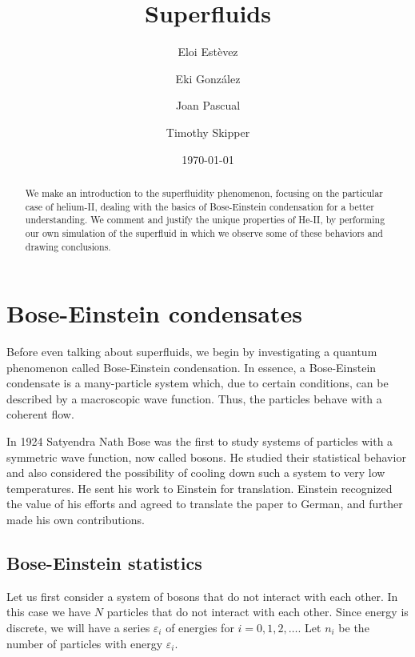 \documentclass{article}
\title{Superfluids}
\author{Eloi Estèvez \and Eki González \and Joan Pascual \and Timothy Skipper}
\date{\today}
\begin{document}
\maketitle
\begin{abstract}

We make an introduction to the superfluidity phenomenon, focusing on the particular case of helium-II, dealing with the basics of Bose-Einstein condensation for a better understanding. We comment and justify the unique properties of He-II, by performing our own simulation of the superfluid in which we observe some of these behaviors and drawing conclusions.


\listoftodos[To-dos]

\end{abstract}
\newpage
\tableofcontents

\section{Bose-Einstein condensates}

Before even talking about superfluids, we begin by investigating a quantum phenomenon called Bose-Einstein condensation.  In essence,
a Bose-Einstein condensate is a many-particle system which, due to certain
conditions, can be described by a macroscopic wave function.  Thus, the particles behave with a coherent flow.

In 1924 Satyendra Nath Bose was the first to study systems of particles with a symmetric wave function, now called bosons.  He studied their statistical behavior and also considered the possibility of cooling down such a system to very low temperatures.  He sent his work to Einstein for translation.  Einstein recognized the value of his efforts and agreed to translate the paper to German, and further made his own contributions.
\\

\subsection{Bose-Einstein statistics}

Let us first consider a system of bosons that do not interact with each other.  In this case we have $N$ particles that do not interact with each other.  Since energy is discrete, we will have a series $\varepsilon_i$ of energies for $i = 0, 1, 2, \dots$.  Let $n_i$ be the number of particles with energy $\varepsilon_i$.
\end{document}
